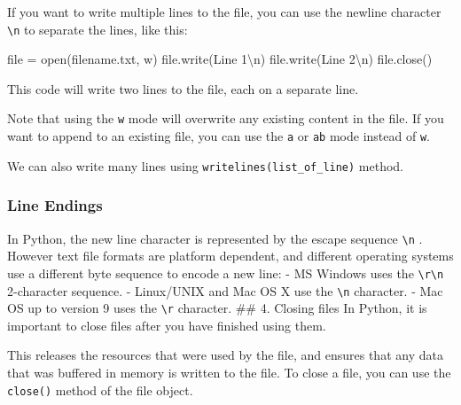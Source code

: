 \documentclass[11pt]{article}
\newenvironment{Shaded}{}{}
\newcommand{\CharTok}[1]{\textcolor[rgb]{0.25,0.44,0.63}{{#1}}}
\newcommand{\StringTok}[1]{\textcolor[rgb]{0.25,0.44,0.63}{{#1}}}
\newcommand{\NormalTok}[1]{{#1}}
\newcommand{\OperatorTok}[1]{\textcolor[rgb]{0.40,0.40,0.40}{{#1}}}
\newcommand{\BuiltInTok}[1]{{#1}}
\begin{document}
If you want to write multiple lines to the file, you can use the newline
character \texttt{\textquotesingle{}\textbackslash{}n\textquotesingle{}}
to separate the lines, like this:

\begin{Shaded}
\begin{Highlighting}[]
\BuiltInTok{file} \OperatorTok{=} \BuiltInTok{open}\NormalTok{(}\StringTok{\textquotesingle{}filename.txt\textquotesingle{}}\NormalTok{, }\StringTok{\textquotesingle{}w\textquotesingle{}}\NormalTok{)}
\BuiltInTok{file}\NormalTok{.write(}\StringTok{\textquotesingle{}Line 1}\CharTok{\textbackslash{}n}\StringTok{\textquotesingle{}}\NormalTok{)}
\BuiltInTok{file}\NormalTok{.write(}\StringTok{\textquotesingle{}Line 2}\CharTok{\textbackslash{}n}\StringTok{\textquotesingle{}}\NormalTok{)}
\BuiltInTok{file}\NormalTok{.close()}
\end{Highlighting}
\end{Shaded}

This code will write two lines to the file, each on a separate line.

Note that using the \texttt{\textquotesingle{}w\textquotesingle{}} mode
will overwrite any existing content in the file. If you want to append
to an existing file, you can use the
\texttt{\textquotesingle{}a\textquotesingle{}} or
\texttt{\textquotesingle{}ab\textquotesingle{}} mode instead of
\texttt{\textquotesingle{}w\textquotesingle{}}.

We can also write many lines using \texttt{writelines(list\_of\_line)}
method.

\hypertarget{line-endings}{%
\subsubsection{Line Endings}\label{line-endings}}

In Python, the new line character is represented by the escape sequence
\texttt{\textbackslash{}n} . However text ﬁle formats are platform
dependent, and diﬀerent operating systems use a diﬀerent byte sequence
to encode a new line: - MS Windows uses the
\texttt{\textbackslash{}r\textbackslash{}n} 2-character sequence. -
Linux/UNIX and Mac OS X use the \texttt{\textbackslash{}n} character. -
Mac OS up to version 9 uses the \texttt{\textbackslash{}r} character.
\#\# 4. Closing files In Python, it is important to close files after
you have finished using them.

This releases the resources that were used by the file, and ensures that
any data that was buffered in memory is written to the file. To close a
file, you can use the \texttt{close()} method of the file object.
\end{document}
